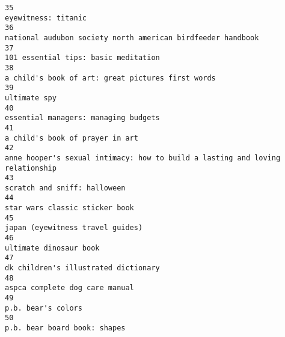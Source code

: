\documentclass[
]{report}
\begin{document}
\begin{verbatim}
35                                                                                                                                                    eyewitness: titanic
36                                                                                                            national audubon society north american birdfeeder handbook
37                                                                                                                                   101 essential tips: basic meditation
38                                                                                                                      a child's book of art: great pictures first words
39                                                                                                                                                           ultimate spy
40                                                                                                                                   essential managers: managing budgets
41                                                                                                                                        a child's book of prayer in art
42                                                                                          anne hooper's sexual intimacy: how to build a lasting and loving relationship
43                                                                                                                                           scratch and sniff: halloween
44                                                                                                                                         star wars classic sticker book
45                                                                                                                                       japan (eyewitness travel guides)
46                                                                                                                                                 ultimate dinosaur book
47                                                                                                                                   dk children's illustrated dictionary
48                                                                                                                                         aspca complete dog care manual
49                                                                                                                                                     p.b. bear's colors
50                                                                                                                                           p.b. bear board book: shapes

\end{verbatim}
\end{document}
